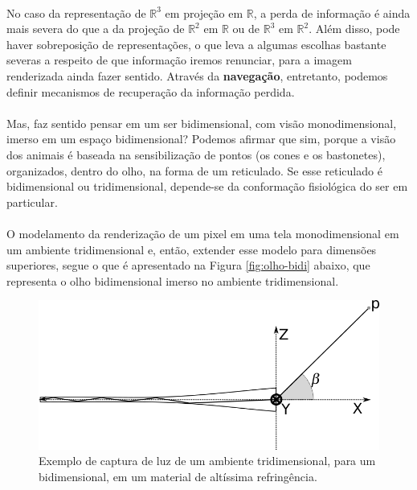 \documentclass{article}
\newcommand\R{\mathbb{R}}
\begin{document}
	\paragraph{}
	No caso da representação de $\R^3$ em projeção em $\R$, a perda de informação é ainda mais severa do que a da projeção de $\R^2$ em $\R$ ou de $\R^3$ em $\R^2$. Além disso, pode haver sobreposição de representações, o que leva a algumas escolhas bastante severas a respeito de que informação iremos renunciar, para a imagem renderizada ainda fazer sentido. Através da \textbf{navegação}, entretanto, podemos definir mecanismos de recuperação da informação perdida.
	
	\paragraph{}
	Mas, faz sentido pensar em um ser bidimensional, com visão monodimensional, imerso em um espaço bidimensional? Podemos afirmar que sim, porque a visão dos animais é baseada na sensibilização de pontos (os cones e os bastonetes), organizados, dentro do olho, na forma de um reticulado. Se esse reticulado é bidimensional ou tridimensional, depende-se da conformação fisiológica do ser em particular.

	\paragraph{}
	O modelamento da renderização de um pixel em uma tela monodimensional em um ambiente tridimensional e, então, extender esse modelo para dimensões superiores, segue o que é apresentado na Figura \ref{fig:olho-bidi} abaixo, que representa o olho bidimensional imerso no ambiente tridimensional.
	
	\begin{figure}
		\centering
		\includegraphics[scale=0.6]{refr-captura-luz}
		\caption{Exemplo de captura de luz de um ambiente tridimensional, para um bidimensional, em um material de altíssima refringência.}
		\label{fig:refr-cap}
	\end{figure}
\end{document}
